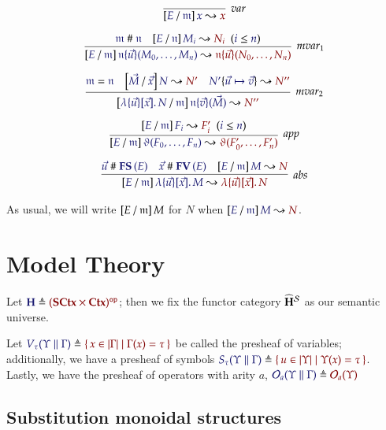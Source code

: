 \documentclass[11pt]{article}
\theoremstyle{definition}
\theoremstyle{remark}
\numberwithin{equation}{section}
\newcommand\HypCat{\mathbf{H}}
\begin{document}
\begin{gather*}
  \infer[\textit{var}]{
    \IsSubst{E}{\MV{m}}{x}{x}
  }{
  }
\\[6pt]
  \infer[\textit{mvar}_1]{
    \IsSubst{E}{\MV{m}}{
      \MApp{\MV{n}}{\vec{u}}{M_0,\dots,M_n}
    }{
      \MApp{\MV{n}}{\vec{u}}{N_0,\dots,N_n}
    }
  }{
    \IsApart{\MV{m}}{\MV{n}}
&
    \HypJ{
      \IsSubst{E}{\MV{n}}{M_i}{N_i}
    }{
      \Leq{i}{n}
    }
  }
\\[6pt]
  \infer[\textit{mvar}_2]{
    \IsSubst{
      \MkBTm{\vec{u}}{\vec{x}}{N}
    }{\MV{m}}{
      \MApp{\MV{n}}{\vec{v}}{\vec{M}}
    }{
      N''
    }
  }{
    \IsEq{\MV{m}}{\MV{n}}
&
    \IsSubst{\vec{M}}{\vec{x}}{N}{N'}
&
    \IsRenaming{\vec{u}\mapsto\vec{v}}{N'}{N''}
  }\\[6pt]
  \infer[\textit{app}]{
    \IsSubst{E}{\MV{m}}{
      \App{\vartheta}{F_0,\dots,F_n}
    }{
      \App{\vartheta}{F'_0,\dots,F'_n}
    }
  }{
    \HypJ{
      \IsSubst{E}{\MV{m}}{F_i}{F'_i}
    }{
      \Leq{i}{n}
    }
  }
\\[6pt]
  \infer[\textit{abs}]{
    \IsSubst{E}{\MV{m}}{
      \MkBTm{\vec{u}}{\vec{x}}{M}
    }{
      \MkBTm{\vec{u}}{\vec{x}}{N}
    }
  }{
    \IsApart{\vec{u}}{\FS{E}}
&
    \IsApart{\vec{x}}{\FV{E}}
&
    \IsSubst{E}{\MV{m}}{M}{N}
  }
\end{gather*}

As usual, we will write $\left[E\, /\, \mathfrak{m}\right]M$ for $N$ when
$\IsSubst{E}{\MV{m}}{M}{N}$.

\section{Model Theory}

Let $\Define{\HypCat}{\OpCat{(\SCtx\times\Ctx)}}$; then we fix the functor
category $\widehat{\HypCat}^\Sorts$ as our semantic universe.

Let $\Define{V_\tau(\Upsilon\parallel\Gamma)}{\MkSet{x\in\Dom\Gamma\mid
    \Gamma(x)=\tau}}$ be called the presheaf of variables; additionally, we have
a presheaf of symbols
$\Define{S_\tau(\Upsilon\parallel\Gamma)}{\MkSet{u\in\Dom\Upsilon\mid
    \Upsilon(x)=\tau}}$. Lastly, we have the presheaf of operators with arity
$a$,
$\Define{\Operators_a(\Upsilon\parallel\Gamma)}{\Operators_a(\Upsilon)}$

\subsection{Substitution monoidal structures}
\newcommand\SymPsh{\mathbf{S}}
\newcommand\VarPsh{\mathbf{V}}
\end{document}

